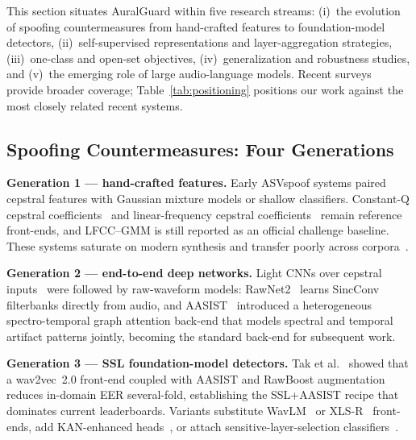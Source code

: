 
This section situates AuralGuard within five research streams: (i)~the evolution of
spoofing countermeasures from hand-crafted features to foundation-model detectors,
(ii)~self-supervised representations and layer-aggregation strategies,
(iii)~one-class and open-set objectives, (iv)~generalization and robustness studies,
and (v)~the emerging role of large audio-language models. Recent
surveys~\cite{yi2023surveyadd,pham2025surveydeepfake,li2025survey} provide broader
coverage; Table~\ref{tab:positioning} positions our work against the most closely
related recent systems.

\subsection{Spoofing Countermeasures: Four Generations}
\label{ssec:related-cm}

\textbf{Generation 1 --- hand-crafted features.} Early ASVspoof systems paired
cepstral features with Gaussian mixture models or shallow classifiers. Constant-Q
cepstral coefficients~\cite{todisco2017constantq} and linear-frequency cepstral
coefficients~\cite{sahidullah2015comparison} remain reference front-ends, and
LFCC--GMM is still reported as an official challenge baseline. These systems saturate
on modern synthesis and transfer poorly across corpora~\cite{wang2020asvspoof2019}.

\textbf{Generation 2 --- end-to-end deep networks.} Light CNNs over cepstral
inputs~\cite{lavrentyeva2019stc} were followed by raw-waveform models:
RawNet2~\cite{tak2021rawnet2} learns SincConv filterbanks directly from audio, and
AASIST~\cite{jung2022aasist} introduced a heterogeneous spectro-temporal graph
attention back-end that models spectral and temporal artifact patterns jointly,
becoming the standard back-end for subsequent work.

\textbf{Generation 3 --- SSL foundation-model detectors.} Tak et
al.~\cite{tak2022automatic} showed that a wav2vec~2.0 front-end coupled with AASIST
and RawBoost augmentation~\cite{tak2022rawboost} reduces in-domain EER several-fold,
establishing the SSL+AASIST recipe that dominates current leaderboards. Variants
substitute WavLM~\cite{chen2022wavlm} or XLS-R~\cite{babu2022xlsr} front-ends, add
KAN-enhanced heads~\cite{borodin2024aasist3}, or attach sensitive-layer-selection
classifiers~\cite{zhang2024slsxlsr}.

